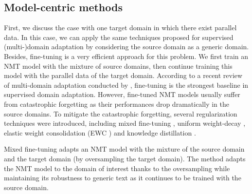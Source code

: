 \subsection{Model-centric methods}
First, we discuss the case with one target domain in which there exist parallel data. In this case, we can apply the same techniques proposed for supervised (multi-)domain adaptation by considering the source domain as a generic domain. Besides, fine-tuning is a very efficient approach for this problem\citep{Luong15stanford,Servan16Domain,Freitag16fast,Miceli17regularization}. We first train an NMT model with the mixture of source domains, then continue training this model with the parallel data of the target domain. According to a recent review of multi-domain adaptation conducted by \citet{Pham21revisiting}, fine-tuning is the strongest baseline in supervised domain adaptation. However, fine-tuned NMT models usually suffer from catastrophic forgetting \citep{Michael89catastrophic} as their performances drop dramatically in the source domains. To mitigate the catastrophic forgetting, several regularization techniques were introduced, including mixed fine-tuning \citep{Chu17empirical}, uniform weight-decay \citep{Miceli17regularization}, elastic weight consolidation (EWC ) \citep{Kirk16overcoming,Brian19overcoming,Saunders19domain} and knowledge distillation \citep{Dakwle17fine}. 

Mixed fine-tuning \citep{Chu17empirical} adapts an NMT model with the mixture of the source domain and the target domain (by oversampling the target domain). The method adapts the NMT model to the domain of interest thanks to the oversampling while maintaining its robustness to generic text as it continues to be trained with the source domain.

